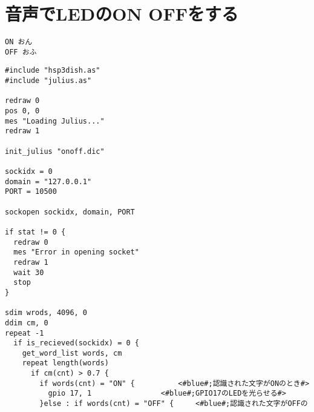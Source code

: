 \newpage
\section{音声でLEDのON OFFをする}

\begin{lstlisting}[caption=onoff.yomi,label=onoff.yomi]
ON おん
OFF おふ
\end{lstlisting}

\begin{lstlisting}[caption=ledvoice.hsp,label=ledvoice.hsp]
#include "hsp3dish.as"
#include "julius.as"

redraw 0
pos 0, 0
mes "Loading Julius..."
redraw 1

init_julius "onoff.dic"

sockidx = 0
domain = "127.0.0.1"
PORT = 10500

sockopen sockidx, domain, PORT

if stat != 0 {
  redraw 0
  mes "Error in opening socket"
  redraw 1
  wait 30
  stop
}

sdim wrods, 4096, 0
ddim cm, 0
repeat -1
  if is_recieved(sockidx) = 0 {
    get_word_list words, cm
    repeat length(words)
      if cm(cnt) > 0.7 {
        if words(cnt) = "ON" {			<#blue#;認識された文字がONのとき#>
          gpio 17, 1				<#blue#;GPIO17のLEDを光らせる#>
        }else : if words(cnt) = "OFF" {		<#blue#;認識された文字がOFFのとき#>
          gpio 17, 0				<#blue#;GPIO17を消す#>
        }
      }
    loop
  }
  redraw 0
  pos 0,0
  mes "話しかけてLEDのONとOFFをしよう"
  redraw 1
  await 30
loop
\end{lstlisting}

HSPプログラムから、音声を使ってLEDをつけたり消したりしてみましょう。 \textasciitilde /06にonoff.yomiファイルがあります。これは音声でLEDのON/OFFをするための辞書ファイルです。この辞書ファイルはリスト\ref{onoff.yomi}のように書いてあります。ONとOFFが表示する文字、おんとおふが読み方です。これをを使って変換したものがonoff.dicです。onoff.dicを使って、音声からLEDをしてみましょう。 \textasciitilde /06/ledbyvoice.hsp を開いてください。\\

()に認識された文字が代入されています。認識された文字がONなのかOFFか文（条件分岐）を使って、LEDを制御しています。\\

\begin{tcolorbox}[title=\useOmetoi]
\begin{enumerate}
\end{enumerate}
\end{tcolorbox}
